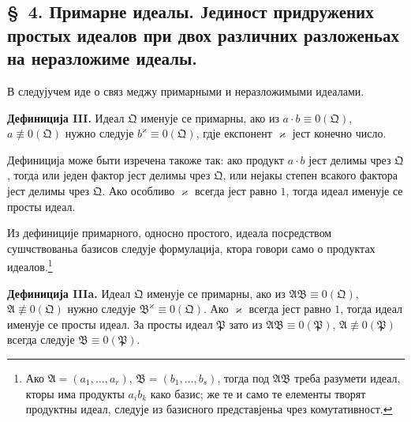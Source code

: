 ﻿\documentclass[11pt]{article}
\newcommand{\ideal}[1]{\mathfrak{#1}}
\begin{document}

\setcounter{footnote}{14}
\subsection*{\S~4. Примарне идеалы. Јединост придружених простых идеалов при двох различних разложеньах на неразложиме идеалы.}

В следујучем иде о связ меджу примарными и неразложимыми идеалами.

\textbf{Дефиниција III.} Идеал \(\ideal Q\) именује се примарны, ако из \(a\cdot b\equiv0(\ideal Q)\), \(a\not\equiv0(\ideal Q)\) нужно следује \(b^\varkappa\equiv0(\ideal Q)\), гдје експонент \(\varkappa\) јест конечно число.

Дефиниција може быти изречена такоже так: ако продукт \(a\cdot b\) јест делимы чрез \(\ideal Q\), тогда или једен фактор јест делимы чрез \(\ideal Q\), или нејакы степен всакого фактора јест делимы чрез \(\ideal Q\). Ако особливо \(\varkappa\) всегда јест равно \(1\), тогда идеал именује се просты идеал.

Из дефиниције примарного, односно простого, идеала посредством сушчствованьа базисов следује формулација, ктора говори само о продуктах идеалов.\footnote{Ако \(\ideal A=(a_1,\ldots,a_r)\), \(\ideal B=(b_1,\ldots,b_s)\), тогда под \(\ideal A\ideal B\) треба разумети идеал, кторы има продукты \(a_i b_k\) како базис; же те и само те елементы творят продуктны идеал, следује из базисного представјеньа чрез комутативност.}

\textbf{Дефиниција IIIa.} Идеал \(\ideal Q\) именује се примарны, ако из \(\ideal A\ideal B\equiv0(\ideal Q)\), \(\ideal A\not\equiv0(\ideal Q)\) нужно следује \(\ideal B^\varkappa\equiv0(\ideal Q)\). Ако \(\varkappa\) всегда јест равно \(1\), тогда идеал именује се просты идеал. За просты идеал \(\ideal P\) зато из \(\ideal A\ideal B\equiv0(\ideal P)\), \(\ideal A\not\equiv0(\ideal P)\) всегда следује \(\ideal B\equiv0(\ideal P)\).
\end{document}
